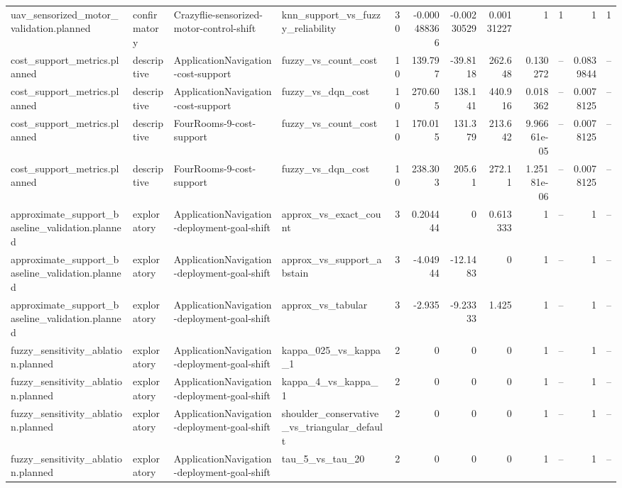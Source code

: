\begin{longtable}{llllrrrrrrrr}
uav\_sensorized\_motor\_validation.planned & confirmatory & Crazyflie-sensorized-motor-control-shift & knn\_support\_vs\_fuzzy\_reliability & 30 & -0.000488366 & -0.00230529 & 0.00131227 & 1 & 1 & 1 & 1 \\
cost\_support\_metrics.planned & descriptive & ApplicationNavigation-cost-support & fuzzy\_vs\_count\_cost & 10 & 139.797 & -39.8118 & 262.648 & 0.130272 & -- & 0.0839844 & -- \\
cost\_support\_metrics.planned & descriptive & ApplicationNavigation-cost-support & fuzzy\_vs\_dqn\_cost & 10 & 270.605 & 138.141 & 440.916 & 0.018362 & -- & 0.0078125 & -- \\
cost\_support\_metrics.planned & descriptive & FourRooms-9-cost-support & fuzzy\_vs\_count\_cost & 10 & 170.015 & 131.379 & 213.642 & 9.96661e-05 & -- & 0.0078125 & -- \\
cost\_support\_metrics.planned & descriptive & FourRooms-9-cost-support & fuzzy\_vs\_dqn\_cost & 10 & 238.303 & 205.61 & 272.11 & 1.25181e-06 & -- & 0.0078125 & -- \\
approximate\_support\_baseline\_validation.planned & exploratory & ApplicationNavigation-deployment-goal-shift & approx\_vs\_exact\_count & 3 & 0.204444 & 0 & 0.613333 & 1 & -- & 1 & -- \\
approximate\_support\_baseline\_validation.planned & exploratory & ApplicationNavigation-deployment-goal-shift & approx\_vs\_support\_abstain & 3 & -4.04944 & -12.1483 & 0 & 1 & -- & 1 & -- \\
approximate\_support\_baseline\_validation.planned & exploratory & ApplicationNavigation-deployment-goal-shift & approx\_vs\_tabular & 3 & -2.935 & -9.23333 & 1.425 & 1 & -- & 1 & -- \\
fuzzy\_sensitivity\_ablation.planned & exploratory & ApplicationNavigation-deployment-goal-shift & kappa\_025\_vs\_kappa\_1 & 2 & 0 & 0 & 0 & 1 & -- & 1 & -- \\
fuzzy\_sensitivity\_ablation.planned & exploratory & ApplicationNavigation-deployment-goal-shift & kappa\_4\_vs\_kappa\_1 & 2 & 0 & 0 & 0 & 1 & -- & 1 & -- \\
fuzzy\_sensitivity\_ablation.planned & exploratory & ApplicationNavigation-deployment-goal-shift & shoulder\_conservative\_vs\_triangular\_default & 2 & 0 & 0 & 0 & 1 & -- & 1 & -- \\
fuzzy\_sensitivity\_ablation.planned & exploratory & ApplicationNavigation-deployment-goal-shift & tau\_5\_vs\_tau\_20 & 2 & 0 & 0 & 0 & 1 & -- & 1 & -- \\

\end{longtable}
